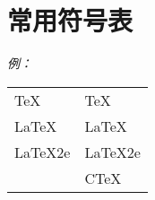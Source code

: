 \chapter{常用符号表}
\emph{例：}\par
\begin{center}
	\begin{tabular}{p{7em}p{20em}}
		\TeX     & TeX     \\
		\LaTeX   & LaTeX   \\
		\LaTeX2e & LaTeX2e \\
		\CTeX    & CTeX    \\
	\end{tabular}
\end{center}
